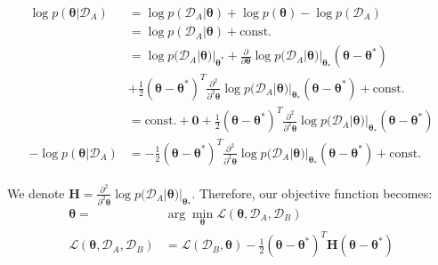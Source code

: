 \documentclass{article}
\begin{document}
\begin{eqnarray}
    \begin{split}
        \log p(\boldsymbol{\theta}|\mathcal D_A) &= 
        \log p(\mathcal D_A | \boldsymbol{\theta}) + \log p(\boldsymbol{\theta})
        - \log p(\mathcal D_A) \\
        &= \log p(\mathcal D_A | \boldsymbol{\theta}) +
        \text{const.} \\
        &= \log p(\mathcal D_A | \boldsymbol{\theta}) |_{\boldsymbol{\theta^*}}
        + \frac{\partial}{\partial \boldsymbol{\theta}}
        \log p(\mathcal D_A|\boldsymbol{\theta})|_{\boldsymbol{\theta_*}} (\boldsymbol{\theta} - \boldsymbol{\theta^*}) \\
        &+ \frac{1}{2}(\boldsymbol{\theta} - \boldsymbol{\theta^*})^T\frac{\partial^2}{\partial^2 \boldsymbol{\theta}}
        \log p(\mathcal D_A|\boldsymbol{\theta})|_{\boldsymbol{\theta_*}} (\boldsymbol{\theta} - \boldsymbol{\theta^*})
        +\text{const.} \\
        &= \text{const.} + \boldsymbol{0} + \frac{1}{2}(\boldsymbol{\theta} - \boldsymbol{\theta^*})^T\frac{\partial^2}{\partial^2 \boldsymbol{\theta}}
        \log p(\mathcal D_A|\boldsymbol{\theta})|_{\boldsymbol{\theta_*}} (\boldsymbol{\theta} - \boldsymbol{\theta^*}) \\
    -\log p(\boldsymbol{\theta}|\mathcal D_A) &= -\frac{1}{2}(\boldsymbol{\theta} - \boldsymbol{\theta^*})^T\frac{\partial^2}{\partial^2 \boldsymbol{\theta}}
    \log p(\mathcal D_A|\boldsymbol{\theta})|_{\boldsymbol{\theta_*}} (\boldsymbol{\theta} - \boldsymbol{\theta^*}) +\text{const.}
    \end{split}
\end{eqnarray}

We denote $\boldsymbol{H} = \frac{\partial^2}{\partial^2 \boldsymbol{\theta}}
\log p(\mathcal D_A|\boldsymbol{\theta})|_{\boldsymbol{\theta_*}}$. Therefore, our objective function
becomes:
\begin{equation}
    \begin{split}
        \boldsymbol{\theta} = & \arg \min_{\boldsymbol{\theta}} \mathcal L(\boldsymbol{\theta}, \mathcal D_A, \mathcal D_B) \\
        \mathcal L(\boldsymbol{\theta}, \mathcal D_A, \mathcal D_B)  &= \mathcal L(\mathcal D_B, \boldsymbol{\theta}) 
        -\frac{1}{2}(\boldsymbol{\theta} - \boldsymbol{\theta^*})^T\boldsymbol{H} (\boldsymbol{\theta} - \boldsymbol{\theta^*})
    \end{split}
\end{equation}
    
\end{document}
